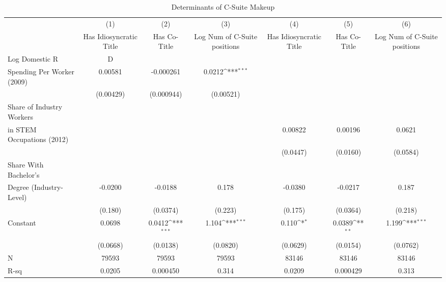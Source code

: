 \begin{table}[htbp]\centering
\def\sym#1{\ifmmode^{#1}\else\(^{#1}\)\fi}
\caption{Determinants of C-Suite Makeup\label{tab1}}
\begin{tabular}{l*{6}{c}}
\toprule
                &\multicolumn{1}{c}{(1)}&\multicolumn{1}{c}{(2)}&\multicolumn{1}{c}{(3)}&\multicolumn{1}{c}{(4)}&\multicolumn{1}{c}{(5)}&\multicolumn{1}{c}{(6)}\\
                &\multicolumn{1}{c}{Has Idiosyncratic Title}&\multicolumn{1}{c}{Has Co- Title}&\multicolumn{1}{c}{Log Num of C-Suite positions}&\multicolumn{1}{c}{Has Idiosyncratic Title}&\multicolumn{1}{c}{Has Co- Title}&\multicolumn{1}{c}{Log Num of C-Suite positions}\\
\midrule
Log Domestic R&D \\ Spending Per Worker (2009)&  0.00581         &-0.000261         &   0.0212\sym{***}&                  &                  &                  \\
                &(0.00429)         &(0.000944)         &(0.00521)         &                  &                  &                  \\
Share of Industry Workers \\ in STEM Occupations (2012)&                  &                  &                  &  0.00822         &  0.00196         &   0.0621         \\
                &                  &                  &                  & (0.0447)         & (0.0160)         & (0.0584)         \\
Share With Bachelor's \\ Degree (Industry-Level)&  -0.0200         &  -0.0188         &    0.178         &  -0.0380         &  -0.0217         &    0.187         \\
                &  (0.180)         & (0.0374)         &  (0.223)         &  (0.175)         & (0.0364)         &  (0.218)         \\
Constant        &   0.0698         &   0.0412\sym{***}&    1.104\sym{***}&    0.110\sym{*}  &   0.0389\sym{**} &    1.199\sym{***}\\
                & (0.0668)         & (0.0138)         & (0.0820)         & (0.0629)         & (0.0154)         & (0.0762)         \\
\midrule
N               &    79593         &    79593         &    79593         &    83146         &    83146         &    83146         \\
R-sq            &   0.0205         & 0.000450         &    0.314         &   0.0209         & 0.000429         &    0.313         \\

\end{tabular}
\end{table}

